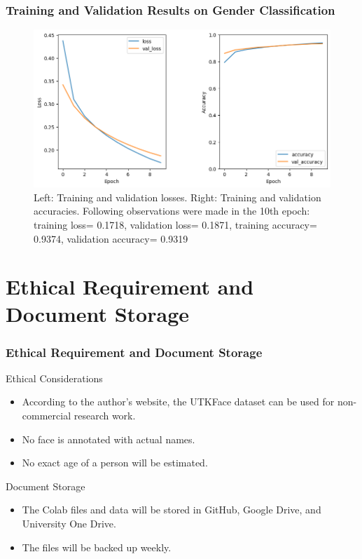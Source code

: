 \documentclass[aspectratio=169]{beamer}
\begin{document}
\begin{frame}
\frametitle{Training and Validation Results on Gender Classification}
\begin{figure}
    \centering
    \includegraphics[scale=0.50]{fig5_learning_curve.png}
    \caption{Left: Training and validation losses. Right: Training and validation accuracies. Following observations were made in the 10th epoch: training loss= 0.1718, validation loss= 0.1871, training accuracy= 0.9374, validation accuracy= 0.9319 }
    \label{fig6}
\end{figure}
\end{frame}

\section{Ethical Requirement and Document Storage}
\begin{frame}
\frametitle{Ethical Requirement and Document Storage}
\begin{exampleblock}{Ethical Considerations}
\begin{itemize}
    \item According to the author’s website, the UTKFace dataset can be used for non-commercial research work.
    \item No face is annotated with actual names.
    \item No exact age of a person will be estimated.
\end{itemize}
\end{exampleblock}
\vfill
\begin{block}{Document Storage}
\begin{itemize}
    \item The Colab files and data will be stored in GitHub, Google Drive, and University One Drive. 
    \item The files will be backed up weekly. 
\end{itemize}
\end{block}

\end{frame}
\end{document}
